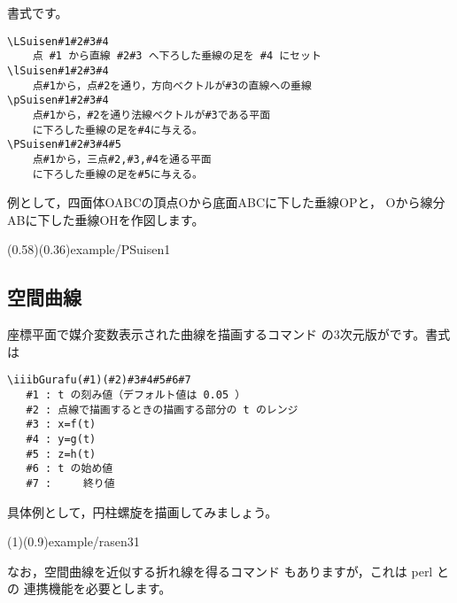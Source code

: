 書式です。
\begin{boxnote}
\begin{verbatim}
\LSuisen#1#2#3#4
    点 #1 から直線 #2#3 へ下ろした垂線の足を #4 にセット
\lSuisen#1#2#3#4
    点#1から，点#2を通り，方向ベクトルが#3の直線への垂線
\pSuisen#1#2#3#4
    点#1から，#2を通り法線ベクトルが#3である平面
    に下ろした垂線の足を#4に与える。
\PSuisen#1#2#3#4#5
    点#1から，三点#2,#3,#4を通る平面
    に下ろした垂線の足を#5に与える。
\end{verbatim}
\end{boxnote}

例として，四面体OABCの頂点Oから底面ABCに下した垂線OPと，
Oから線分ABに下した垂線OHを作図します。

\showexample[垂線](0.58)(0.36){example/PSuisen1}

\subsection{空間曲線}
座標平面で媒介変数表示された曲線を描画するコマンド
の3次元版がです。書式は

\begin{boxnote}
\begin{verbatim}
\iiibGurafu(#1)(#2)#3#4#5#6#7
   #1 : t の刻み値（デフォルト値は 0.05 ）
   #2 : 点線で描画するときの描画する部分の t のレンジ
   #3 : x=f(t)
   #4 : y=g(t)
   #5 : z=h(t)
   #6 : t の始め値
   #7 :     終り値
\end{verbatim}
\end{boxnote}

具体例として，円柱螺旋を描画してみましょう。

\showexample[円柱螺旋](1)(0.9){example/rasen31}

なお，空間曲線を近似する折れ線を得るコマンド
もありますが，これは \textsf{perl} との
連携機能を必要とします。

